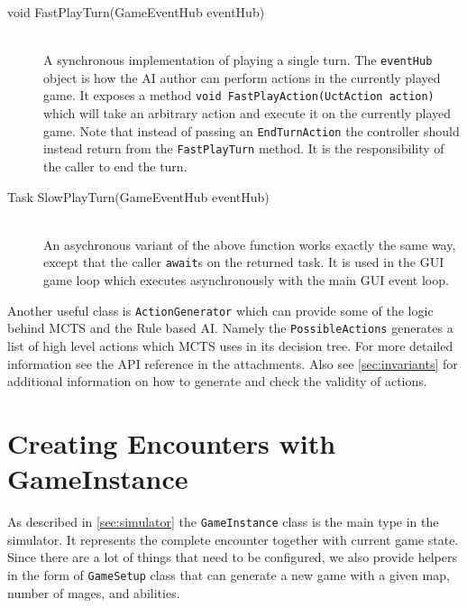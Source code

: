 \begin{description}
	\item[void FastPlayTurn(GameEventHub eventHub)] \hfill \\
	A synchronous implementation of playing a single turn. The \verb|eventHub| object is how the AI author can perform actions in the currently played game. It exposes a method \verb|void FastPlayAction(UctAction action)| which will take an arbitrary action and execute it on the currently played game. Note that instead of passing an \verb|EndTurnAction| the controller should instead return from the \verb|FastPlayTurn| method. It is the responsibility of the caller to end the turn.
	
	\item[Task SlowPlayTurn(GameEventHub eventHub)] \hfill \\
	An asychronous variant of the above function works exactly the same way, except that the caller \verb|await|s on the returned task. It is used in the GUI game loop which executes asynchronously with the main GUI event loop.
\end{description}

Another useful class is \verb|ActionGenerator| which can provide some of the logic behind MCTS and the Rule based AI. Namely the \verb|PossibleActions| generates a list of high level actions which MCTS uses in its decision tree. For more detailed information see the API reference in the attachments. Also see \autoref{sec:invariants} for additional information on how to generate and check the validity of actions.

\section{Creating Encounters with GameInstance}

As described in \autoref{sec:simulator} the \verb|GameInstance| class is the main type in the simulator. It represents the complete encounter together with current game state. Since there are a lot of things that need to be configured, we also provide helpers in the form of \verb|GameSetup| class that can generate a new game with a given map, number of mages, and abilities. 

